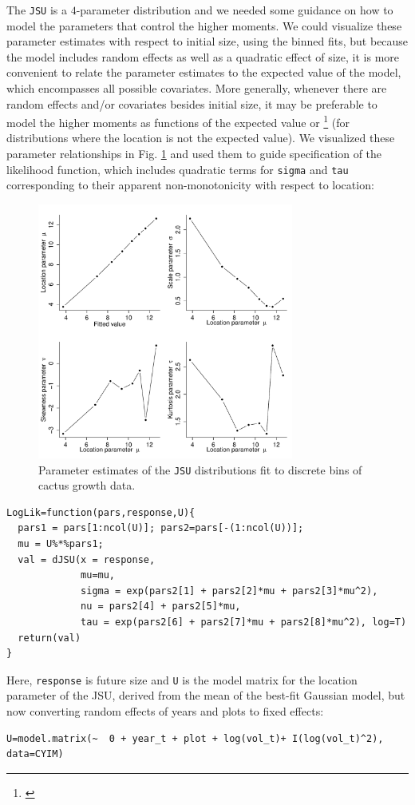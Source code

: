 \documentclass[11pt]{article}
\newcommand{\tom}[2]{{\color{red}{#1}}\footnote{\textit{\color{red}{#2}}}}
\begin{document}
{The \texttt{JSU} is a $4$-parameter distribution and we needed some guidance on how to model the parameters that control the higher moments. 
We could visualize these parameter estimates with respect to initial size, using the binned fits, but because the model includes random effects as well as a quadratic effect of size, it is more convenient to relate the parameter estimates to the expected value of the model, which encompasses all possible covariates.
More generally, whenever there are random effects and/or covariates besides initial size, it may be preferable to model the higher moments as functions of the expected value or \tom{location}{Steve has introduced the `$\mu$ is not the mean' idea in the previous section so maybe I don't need to say much about it here.} (for distributions where the location is not the expected value). 
We visualized these parameter relationships in Fig. \ref{fig:cactus_binned_JSU} and used them to guide specification of the likelihood function, which includes quadratic terms for \texttt{sigma} and \texttt{tau} corresponding to their apparent non-monotonicity with respect to location:
\begin{figure}
\centering
\includegraphics[width=0.75\textwidth]{figures/cactus_binned_JSU}
\caption{Parameter estimates of the \texttt{JSU} distributions fit to discrete bins of cactus growth data.}
\label{fig:cactus_binned_JSU}
\end{figure} 

\begin{lstlisting}
LogLik=function(pars,response,U){
  pars1 = pars[1:ncol(U)]; pars2=pars[-(1:ncol(U))];
  mu = U%*%pars1;  
  val = dJSU(x = response, 
             mu=mu,
             sigma = exp(pars2[1] + pars2[2]*mu + pars2[3]*mu^2), 
             nu = pars2[4] + pars2[5]*mu, 
             tau = exp(pars2[6] + pars2[7]*mu + pars2[8]*mu^2), log=T) 
  return(val)
} 
\end{lstlisting}
Here, \texttt{response} is future size and \texttt{U} is the model matrix for the location parameter of the JSU, derived from the mean of the best-fit Gaussian model, but now converting random effects of years and plots to fixed effects:
\begin{lstlisting}
U=model.matrix(~  0 + year_t + plot + log(vol_t)+ I(log(vol_t)^2), data=CYIM)
\end{lstlisting}

}
\end{document}
